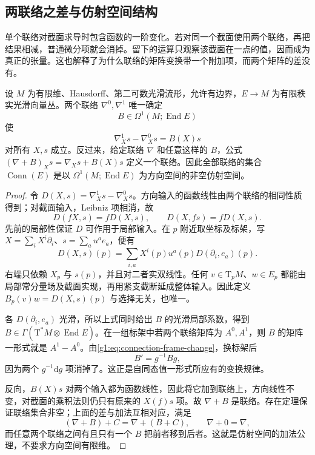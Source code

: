 \subsection{两联络之差与仿射空间结构}
\label{g1:subsec:1501:03}

单个联络对截面求导时包含函数的一阶变化。若对同一个截面使用两个联络，再把结果相减，普通微分项就会消掉。留下的运算只观察该截面在一点的值，因而成为真正的张量。这也解释了为什么联络的矩阵变换带一个附加项，而两个矩阵的差没有。

\begin{proposition}\label{g1:prop:connection-affine-space}
	设 \(M\) 为有限维、Hausdorff、第二可数光滑流形，允许有边界，\(E\to M\) 为有限秩实光滑向量丛。两个联络 \(\nabla^0,\nabla^1\) 唯一确定
	\[
		B\in\Omega^1(M;\operatorname{End}E)
	\]
	使
	\[
		\nabla^1_Xs-\nabla^0_Xs=B(X)s
	\]
	对所有 \(X,s\) 成立。反过来，给定联络 \(\nabla\) 和任意这样的 \(B\)，公式 \((\nabla+B)_Xs=\nabla_Xs+B(X)s\) 定义一个联络。因此全部联络的集合 \(\operatorname{Conn}(E)\) 是以 \(\Omega^1(M;\operatorname{End}E)\) 为方向空间的非空仿射空间。
\end{proposition}
\begin{proof}
	令 \(D(X,s)=\nabla^1_Xs-\nabla^0_Xs\)。方向输入的函数线性由两个联络的相同性质得到；对截面输入，Leibniz 项相消，故
	\[
		D(fX,s)=fD(X,s),\qquad D(X,fs)=fD(X,s).
	\]
	先前的局部性保证 \(D\) 可作用于局部输入。在 \(p\) 附近取坐标及标架，写 \(X=\sum_iX^i\partial_i\)、\(s=\sum_a u^a e_a\)，便有
	\[
		D(X,s)(p)=\sum_{i,a}X^i(p)u^a(p)D(\partial_i,e_a)(p).
	\]
	右端只依赖 \(X_p\) 与 \(s(p)\)，并且对二者实双线性。任何 \(v\in \mathrm{T}_pM\)、\(w\in E_p\) 都能由局部常分量场及截面实现，再用紧支截断延成整体输入。因此定义 \(B_p(v)w=D(X,s)(p)\) 与选择无关，也唯一。

	各 \(D(\partial_i,e_a)\) 光滑，所以上式同时给出 \(B\) 的光滑局部系数，得到 \(B\in\Gamma(\mathrm{T}^*M\otimes\operatorname{End}E)\)。在一组标架中若两个联络矩阵为 \(A^0,A^1\)，则 \(B\) 的矩阵一形式就是 \(A^1-A^0\)。由\eqref{g1:eq:connection-frame-change}，换标架后
	\[
		B'=g^{-1}Bg,
	\]
	因为两个 \(g^{-1}\mathrm{d}g\) 项消掉了。这正是自同态值一形式所应有的变换规律。

	反向，\(B(X)s\) 对两个输入都为函数线性，因此将它加到联络上，方向线性不变，对截面的乘积法则仍只有原来的 \(X(f)s\) 项。故 \(\nabla+B\) 是联络。存在定理保证联络集合非空；上面的差与加法互相对应，满足
	\[
		(\nabla+B)+C=\nabla+(B+C),\qquad \nabla+0=\nabla,
	\]
	而任意两个联络之间有且只有一个 \(B\) 把前者移到后者。这就是仿射空间的加法公理，不要求方向空间有限维。
\end{proof}

